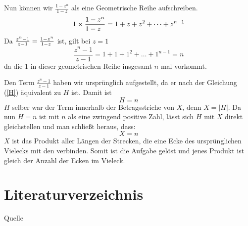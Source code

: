 \documentclass[a4paper,12pt]{article} %
\begin{document}
Nun können wir $\frac{1-z^n}{1-z}$ als eine Geometrische Reihe aufschreiben.
\[1\times\frac{1-z^n}{1-z\hspace{2mm}}=1+z+z^2+\dots+z^{n-1}\]
Da $\frac{z^n-1}{z-1}=\frac{1-z^n}{1-z\hspace{1mm}}$ ist, gilt bei $z=1$
\[\frac{z^n-1}{z-1}=1+1+1^2+\dots+1^{n-1}=n\]
da die $1$ in dieser geometrischen Reihe insgesamt $n$ mal vorkommt.

Den Term $\frac{z^n-1}{z-1}$ haben wir ursprünglich aufgestellt, da er nach der Gleichung (\ref{H}) äquivalent zu $H$ ist. Damit ist
\[H=n\]
$H$ selber war der Term innerhalb der Betragsstriche von $X$, denn $X=|H|$.
Da nun $H=n$ ist mit $n$ als eine zwingend positive Zahl, lässt sich $H$ mit $X$ direkt gleichstellen und man schließt heraus, dass:
\[X=n\]
$X$ ist das Produkt aller Längen der Strecken, die eine Ecke des ursprünglichen Vielecks mit den verbinden. Somit ist die Aufgabe gelöst und jenes Produkt ist gleich der Anzahl der Ecken im Vieleck.





\section{Literaturverzeichnis}

\renewcommand{\refname}{Literaturverzeichnis}  %

\begin{thebibliography}{9}
	 Quelle
	
\end{thebibliography}
\end{document}

